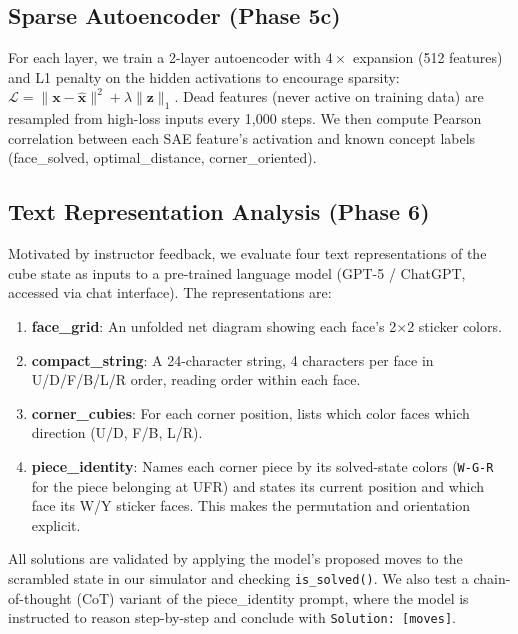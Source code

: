 \documentclass[12pt]{article}
\begin{document}
\subsection{Sparse Autoencoder (Phase 5c)}

For each layer, we train a 2-layer autoencoder with $4{\times}$ expansion (512
features) and L1 penalty on the hidden activations to encourage sparsity:
$\mathcal{L} = \|\mathbf{x} - \hat{\mathbf{x}}\|^2 + \lambda \|\mathbf{z}\|_1$.
Dead features (never active on training data) are resampled from high-loss inputs
every 1,000 steps.  We then compute Pearson correlation between each SAE feature's
activation and known concept labels (face\_solved, optimal\_distance,
corner\_oriented).

\subsection{Text Representation Analysis (Phase 6)}

Motivated by instructor feedback, we evaluate four text representations of the
cube state as inputs to a pre-trained language model (GPT-5 / ChatGPT, accessed
via chat interface).  The representations are:

\begin{enumerate}
  \item \textbf{face\_grid}: An unfolded net diagram showing each face's 2$\times$2
        sticker colors.
  \item \textbf{compact\_string}: A 24-character string, 4 characters per face in
        U/D/F/B/L/R order, reading order within each face.
  \item \textbf{corner\_cubies}: For each corner position, lists which color faces
        which direction (U/D, F/B, L/R).
  \item \textbf{piece\_identity}: Names each corner piece by its solved-state colors
        (\texttt{W-G-R} for the piece belonging at UFR) and states its current
        position and which face its W/Y sticker faces.  This makes the permutation
        and orientation explicit.
\end{enumerate}

All solutions are validated by applying the model's proposed moves to the
scrambled state in our simulator and checking \texttt{is\_solved()}.  We also
test a chain-of-thought (CoT) variant of the piece\_identity prompt, where the
model is instructed to reason step-by-step and conclude with
\texttt{Solution: [moves]}.
\end{document}
